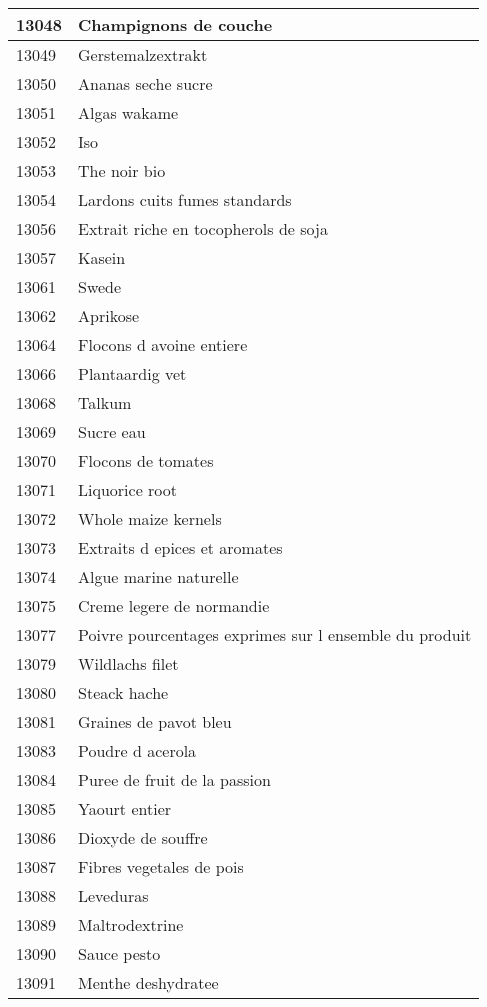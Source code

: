 \begin{longtable}{|l|l|}
13048 & Champignons de couche \\ \hline 
13049 & Gerstemalzextrakt \\ \hline 
13050 & Ananas seche sucre \\ \hline 
13051 & Algas wakame \\ \hline 
13052 & Iso \\ \hline 
13053 & The noir bio \\ \hline 
13054 & Lardons cuits fumes standards \\ \hline 
13056 & Extrait riche en tocopherols de soja \\ \hline 
13057 & Kasein \\ \hline 
13061 & Swede \\ \hline 
13062 & Aprikose \\ \hline 
13064 & Flocons d avoine entiere \\ \hline 
13066 & Plantaardig vet \\ \hline 
13068 & Talkum \\ \hline 
13069 & Sucre eau \\ \hline 
13070 & Flocons de tomates \\ \hline 
13071 & Liquorice root \\ \hline 
13072 & Whole maize kernels \\ \hline 
13073 & Extraits d epices et aromates \\ \hline 
13074 & Algue marine naturelle \\ \hline 
13075 & Creme legere de normandie \\ \hline 
13077 & Poivre pourcentages exprimes sur l ensemble du produit \\ \hline 
13079 & Wildlachs filet \\ \hline 
13080 & Steack hache \\ \hline 
13081 & Graines de pavot bleu \\ \hline 
13083 & Poudre d acerola \\ \hline 
13084 & Puree de fruit de la passion \\ \hline 
13085 & Yaourt entier \\ \hline 
13086 & Dioxyde de souffre \\ \hline 
13087 & Fibres vegetales de pois \\ \hline 
13088 & Leveduras \\ \hline 
13089 & Maltrodextrine \\ \hline 
13090 & Sauce pesto \\ \hline 
13091 & Menthe deshydratee \\ \hline 

\end{longtable}
